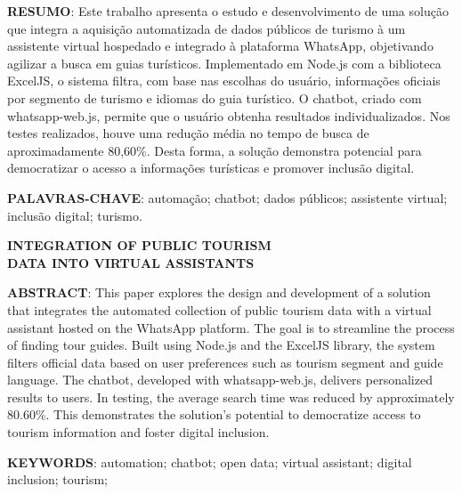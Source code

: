 \documentclass[a4paper,11pt]{article} %
\begin{document}






\vspace{0.5cm}
\noindent\textbf{RESUMO}: Este trabalho apresenta o estudo e desenvolvimento de uma solução que integra a aquisição automatizada de dados públicos de turismo à um assistente virtual hospedado e integrado à plataforma WhatsApp, objetivando agilizar a busca em guias turísticos. Implementado em Node.js com a biblioteca ExcelJS, o sistema filtra, com base nas escolhas do usuário, informações oficiais por segmento de turismo e idiomas do guia turístico. O chatbot, criado com whatsapp-web.js, permite que o usuário obtenha resultados individualizados. Nos testes realizados, houve uma redução média no tempo de busca de aproximadamente 80,60\%. Desta forma, a solução demonstra potencial para democratizar o acesso a informações turísticas e promover inclusão digital.

\vspace{0.5cm}
\noindent\textbf{PALAVRAS-CHAVE}: automação; chatbot; dados públicos; assistente virtual; inclusão digital; turismo.

\vspace{0.5cm}
\begin{center}
\textbf{INTEGRATION OF PUBLIC TOURISM\\DATA INTO VIRTUAL ASSISTANTS}
\end{center}

\noindent\textbf{ABSTRACT}: This paper explores the design and development of a solution that integrates the automated collection of public tourism data with a virtual assistant hosted on the WhatsApp platform. The goal is to streamline the process of finding tour guides. Built using Node.js and the ExcelJS library, the system filters official data based on user preferences such as tourism segment and guide language. The chatbot, developed with whatsapp-web.js, delivers personalized results to users. In testing, the average search time was reduced by approximately 80.60\%. This demonstrates the solution’s potential to democratize access to tourism information and foster digital inclusion.

\vspace{0.5cm}
\noindent\textbf{KEYWORDS}: automation; chatbot; open data; virtual assistant; digital inclusion; tourism; 
\end{document}
